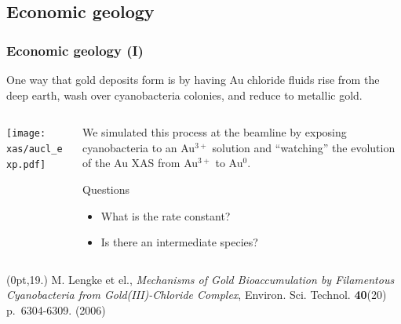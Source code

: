 \documentclass[10pt, xcolor=x11names, compress, handout]{beamer}
\begin{document}
\subsection[Economic geology]{Economic geology}
\begin{frame}
  \frametitle{Economic geology (I)}

  One way that gold deposits form is by having Au chloride fluids rise
  from the deep earth, wash over cyanobacteria colonies, and reduce to
  metallic gold.

  \begin{columns}
    \begin{column}{0.5\linewidth}
      \texttt{[image: xas/aucl\_exp.pdf]}
    \end{column}
    \begin{column}{0.5\linewidth}
      We simulated this process at the beamline by exposing
      cyanobacteria to an Au$^{3+}$ solution and ``watching'' the
      evolution of the Au XAS from Au$^{3+}$ to Au$^0$.

      \begin{block}{Questions}
        \begin{itemize}
        \item What is the rate constant?
        \item Is there an intermediate species?
        \end{itemize}
      \end{block}
    \end{column}
  \end{columns}

  \begin{textblock*}{0.5\linewidth}(0pt,19.\TPVertModule) 
    \tiny
    M. Lengke et el., \textit{Mechanisms of Gold Bioaccumulation by
      Filamentous Cyanobacteria from Gold(III)-Chloride Complex},
    Environ. Sci. Technol. \textbf{40}(20) p.~6304-6309. (2006)
  \end{textblock*}
\end{frame}
\end{document}

